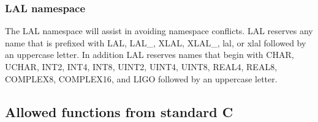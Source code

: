 \documentclass[10pt]{ligodcc}
\renewcommand{\texttt}[1]{{\ttfamily\color{blue}#1}}
\begin{document}
\subsubsection*{LAL namespace}

The LAL namespace will assist in avoiding namespace conflicts.  LAL reserves
any name that is prefixed with \texttt{LAL}, \texttt{LAL\_}, \texttt{XLAL},
\texttt{XLAL\_}, \texttt{lal}, or \texttt{xlal} followed by an uppercase
letter.  In addition LAL reserves names that begin with
\texttt{CHAR}, \texttt{UCHAR}, \texttt{INT2}, \texttt{INT4}, \texttt{INT8},
\texttt{UINT2}, \texttt{UINT4}, \texttt{UINT8}, \texttt{REAL4}, \texttt{REAL8},
\texttt{COMPLEX8}, \texttt{COMPLEX16}, and \texttt{LIGO} followed by an
uppercase letter.

\subsection{Allowed functions from standard C}
\end{document}
